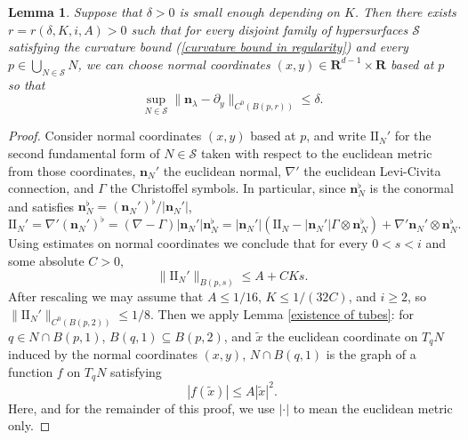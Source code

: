 \documentclass[reqno,11pt]{amsart}
\newcommand{\RR}{\mathbf{R}}
\newcommand{\Two}{\mathrm{I\!I}}
\newcommand{\normal}{\mathbf n}
\newtheorem{lemma}[theorem]{Lemma}
\theoremstyle{definition}
\numberwithin{equation}{section}
\begin{document}
\begin{lemma}\label{lams have C0 fields}
	Suppose that $\delta > 0$ is small enough depending on $K$.
	Then there exists $r = r(\delta, K, i, A) > 0$ such that for every disjoint family of hypersurfaces $\mathcal S$ satisfying the curvature bound (\ref{curvature bound in regularity}) and every $p \in \bigcup_{N \in \mathcal S} N$, we can choose normal coordinates $(x, y) \in \RR^{d - 1} \times \RR$ based at $p$ so that
\begin{equation}\label{normal is basically dy}
	\sup_{N \in \mathcal S} \|\normal_\lambda - \partial_y\|_{C^0(B(p, r))} \leq \delta.
\end{equation}
\end{lemma}
\begin{proof}
Consider normal coordinates $(x, y)$ based at $p$, and write $\Two_N'$ for the second fundamental form of $N \in \mathcal S$ taken with respect to the euclidean metric from those coordinates, $\normal_N'$ the euclidean normal, $\nabla'$ the euclidean Levi-Civita connection, and $\Gamma$ the Christoffel symbols.
In particular, since $\normal_N^\flat$ is the conormal and satisfies $\normal_N^\flat = (\normal_N')^\flat/|\normal_N'|$, 
$$\Two_N' = \nabla' (\normal_N')^\flat = (\nabla - \Gamma) |\normal_N'| \normal_N^\flat = |\normal_N'| (\Two_N - |\normal_N'| \Gamma \otimes \normal_N^\flat) + \nabla' \normal_N' \otimes \normal_N^\flat.$$
Using estimates on normal coordinates we conclude that for every $0 < s < i$ and some absolute $C > 0$,
$$\|\Two_N'\|_{B(p, s)} \leq A + CKs.$$
After rescaling we may assume that $A \leq 1/16$, $K \leq 1/(32C)$, and $i \geq 2$, so $\|\Two_N'\|_{C^0(B(p, 2))} \leq 1/8$.
Then we apply Lemma \ref{existence of tubes}: for $q \in N \cap B(p, 1)$, $B(q, 1) \subseteq B(p, 2)$, and $\tilde x$ the euclidean coordinate on $T_q N$ induced by the normal coordinates $(x, y)$, $N \cap B(q, 1)$ is the graph of a function $f$ on $T_q N$ satisfying
\begin{equation}\label{living in a tube}
|f(\tilde x)| \leq A|\tilde x|^2.
\end{equation}
Here, and for the remainder of this proof, we use $|\cdot|$ to mean the euclidean metric only.


\end{proof}
\end{document}

